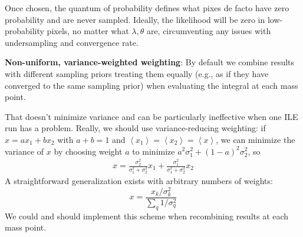 Once chosen, the quantum of probability defines what pixes de facto have zero probability and are never sampled. 
Ideally, the likelihood will be zero in  low-probability pixels, no matter what $\lambda,\theta$ are, circumventing
any issues with undersampling and convergence rate.


\textbf{Non-uniform, variance-weighted weighting}: By default we combine results with different sampling priors treating
them equally (e.g., as if they have converged to the same sampling prior) when evaluating the integral at each mass
point.  

That doesn't minimize variance and can be particularly
ineffective when one ILE run has a problem.  Really, we should use variance-reducing weighting: if $x=ax_1 +b x_2$ with $a+b=1$ and
$\left<x_1\right> =\left<x_2\right> =\left<x\right>$, we can minimize the variance of $x$ by choosing weight $a$ to
minimize $a^2 \sigma_1^2 + (1-a)^2 \sigma_2^2$, so 
\begin{eqnarray}
x = \frac{\sigma_2^2}{\sigma_1^2+\sigma_2^2} x_1 +  \frac{\sigma_1^2}{\sigma_1^2+\sigma_2^2} x_2
\end{eqnarray}
A straightforward generalization exists with arbitrary numbers of weights:
\[
x = \frac{x_k/\sigma_k^2}{\sum_q 1/\sigma_q^2}
\]
We could and should implement this scheme when recombining results at each mass point. 

